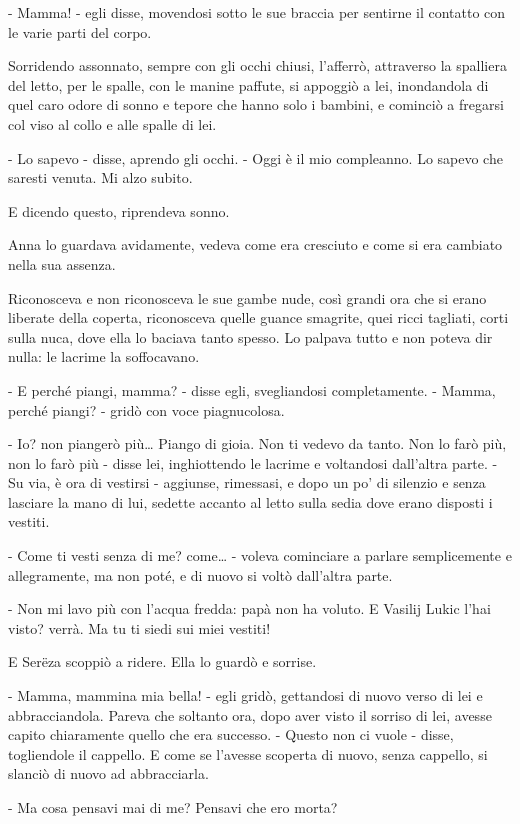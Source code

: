 - Mamma! - egli disse, movendosi sotto le sue braccia per sentirne il contatto con le varie parti del corpo. 

Sorridendo assonnato, sempre con gli occhi chiusi, l'afferrò, attraverso la spalliera del letto, per le spalle, con le manine paffute, si appoggiò a lei, inondandola di quel caro odore di sonno e tepore che hanno solo i bambini, e cominciò a fregarsi col viso al collo e alle spalle di lei. 

- Lo sapevo - disse, aprendo gli occhi. - Oggi è il mio compleanno. Lo sapevo che saresti venuta. Mi alzo subito. 

E dicendo questo, riprendeva sonno. 

Anna lo guardava avidamente, vedeva come era cresciuto e come si era cambiato nella sua assenza. 

Riconosceva e non riconosceva le sue gambe nude, così grandi ora che si erano liberate della coperta, riconosceva quelle guance smagrite, quei ricci tagliati, corti sulla nuca, dove ella lo baciava tanto spesso. Lo palpava tutto e non poteva dir nulla: le lacrime la soffocavano. 

- E perché piangi, mamma? - disse egli, svegliandosi completamente. - Mamma, perché piangi? - gridò con voce piagnucolosa. 

- Io? non piangerò più\ldots{} Piango di gioia. Non ti vedevo da tanto. Non lo farò più, non lo farò più - disse lei, inghiottendo le lacrime e voltandosi dall'altra parte. - Su via, è ora di vestirsi - aggiunse, rimessasi, e dopo un po' di silenzio e senza lasciare la mano di lui, sedette accanto al letto sulla sedia dove erano disposti i vestiti. 

- Come ti vesti senza di me? come\ldots{} - voleva cominciare a parlare semplicemente e allegramente, ma non poté, e di nuovo si voltò dall'altra parte. 

- Non mi lavo più con l'acqua fredda: papà non ha voluto. E Vasilij Lukic l'hai visto? verrà. Ma tu ti siedi sui miei vestiti! 

E Serëza scoppiò a ridere. Ella lo guardò e sorrise. 

- Mamma, mammina mia bella! - egli gridò, gettandosi di nuovo verso di lei e abbracciandola. Pareva che soltanto ora, dopo aver visto il sorriso di lei, avesse capito chiaramente quello che era successo. - Questo non ci vuole - disse, togliendole il cappello. E come se l'avesse scoperta di nuovo, senza cappello, si slanciò di nuovo ad abbracciarla. 

- Ma cosa pensavi mai di me? Pensavi che ero morta? 

